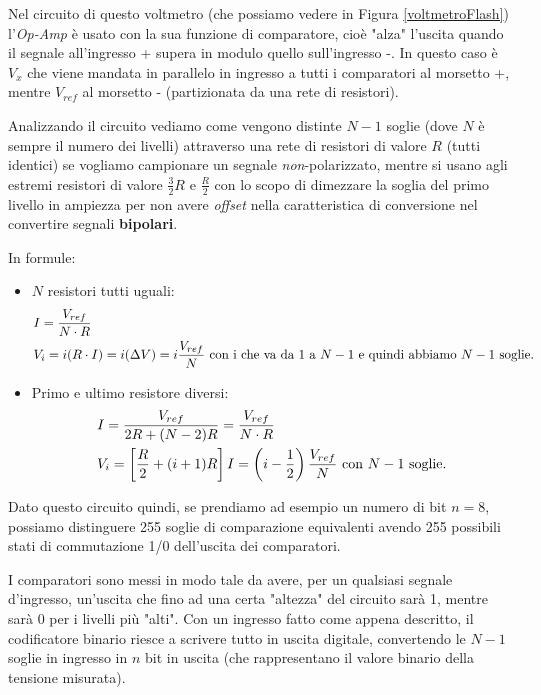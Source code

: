 \documentclass[a4paper,11pt]{report}
\begin{document}
Nel circuito di questo voltmetro (che possiamo vedere in Figura \ref{voltmetroFlash}) l'\textit{Op-Amp} è usato con la sua funzione di comparatore, cioè "alza" l'uscita quando il segnale all'ingresso + supera in modulo quello sull'ingresso -. In questo caso è $ V_x $ che viene mandata in parallelo in ingresso a tutti i comparatori al morsetto +, mentre $ V_{ref} $ al morsetto - (partizionata da una rete di resistori).

Analizzando il circuito vediamo come vengono distinte $ N-1 $ soglie (dove $ N $ è sempre il numero dei livelli) attraverso una rete di resistori di valore $ R $ (tutti identici) se vogliamo campionare un segnale \textit{non}-polarizzato, mentre si usano agli estremi resistori di valore $ \frac{3}{2} R$ e $ \frac{R}{2} $ con lo scopo di dimezzare la soglia del primo livello in ampiezza per non avere \textit{offset} nella caratteristica di conversione nel convertire segnali \textbf{bipolari}.

In formule\footnotemark[1]:
\begin{itemize}
  \item $ N $ resistori tutti uguali:
  \begin{align*}
    &I = \frac{V_{ref}}{N\cdot R}\\
    &V_i = i(R\cdot I) = i(\Delta V) = i\frac{V_{ref}}{N}\text{ con i che va da 1 a $N-1$ e quindi abbiamo $ N-1 $ soglie.}
  \end{align*}
  \item Primo e ultimo resistore diversi:
  \begin{align*}
    &I = \frac{V_{ref}}{2R+(N-2)R} = \frac{V_{ref}}{N\cdot R}\\
    &V_i = \left[ \frac{R}{2}+(i+1)R\right] I = \left( i-\frac{1}{2} \right)\frac{V_{ref}}{N}\text{ con $ N-1 $ soglie.}
  \end{align*}
\end{itemize} 
Dato questo circuito quindi, se prendiamo ad esempio un numero di bit $ n = 8 $, possiamo distinguere 255 soglie di comparazione equivalenti avendo 255 possibili stati di commutazione 1/0 dell'uscita dei comparatori.

I comparatori sono messi in modo tale da avere, per un qualsiasi segnale d'ingresso, un'uscita che fino ad una certa "altezza" del circuito sarà 1, mentre sarà 0 per i livelli più "alti". Con un ingresso fatto come appena descritto, il codificatore binario riesce a scrivere tutto in uscita digitale, convertendo le $ N-1 $ soglie in ingresso in $ n $ bit in uscita (che rappresentano il valore binario della tensione misurata). \\
\end{document}
